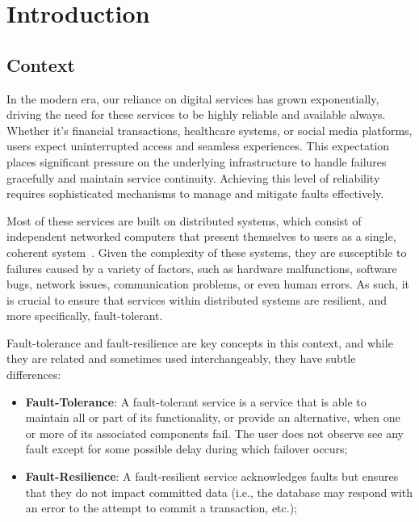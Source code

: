 \chapter{Introduction}\label{ch:introduction}


\section{Context}\label{sec:context}

In the modern era, our reliance on digital services has grown exponentially, driving the need for these services to be highly reliable and available always.
Whether it's financial transactions, healthcare systems, or social media platforms, users expect uninterrupted access and seamless experiences.
This expectation places significant pressure on the underlying infrastructure to handle failures gracefully and maintain service continuity.
Achieving this level of reliability requires sophisticated mechanisms to manage and mitigate faults effectively.

Most of these services are built on distributed systems,
which consist of independent networked computers that present themselves to users as a single,
coherent system~\cite{fcc-distributed-systems}.
Given the complexity of these systems, they are susceptible to failures caused by a variety of factors, such as hardware malfunctions, software bugs, network issues, communication problems, or even human errors.
As such, it is crucial to ensure that services within distributed systems are resilient, and more specifically, fault-tolerant.

Fault-tolerance and fault-resilience are key concepts in this context, and while they are related and sometimes used interchangeably, they have subtle differences:

\begin{itemize}
    \item {\textbf{Fault-Tolerance}}:
    A fault-tolerant service is a service that is able to maintain all or part of its functionality,
    or provide an alternative, when one or more of its associated components fail.
    The user does not observe see any fault except for some possible delay during which failover occurs;
    \item {\textbf{Fault-Resilience}}: A fault-resilient service acknowledges faults but ensures that they do not impact committed data (i.e., the database may respond with an error to the attempt to commit a transaction, etc.);
\end{itemize}

